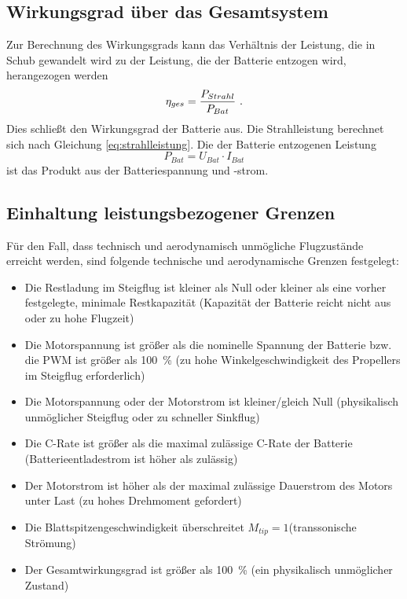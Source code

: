 \subsection{Wirkungsgrad über das Gesamtsystem}
\label{subsec:eta_ges}
Zur Berechnung des Wirkungsgrads kann das Verhältnis der Leistung, die in Schub gewandelt wird zu der Leistung, die der Batterie entzogen wird, herangezogen werden
\begin{equation}
	\eta_{ges} = \frac{P_{Strahl}}{P_{Bat}} ~\text{.}
\end{equation}
Dies schließt den Wirkungsgrad der Batterie aus.
Die Strahlleistung berechnet sich nach Gleichung \ref{eq:strahlleistung}.
Die der Batterie entzogenen Leistung
\begin{equation}
	P_{Bat} = U_{Bat}\cdot I_{Bat}
\end{equation}
ist das Produkt aus der Batteriespannung und -strom.


\subsection{Einhaltung leistungsbezogener Grenzen}
\label{subsec:grenzen}
Für den Fall, dass technisch und aerodynamisch unmögliche Flugzustände erreicht werden, sind folgende technische und aerodynamische Grenzen festgelegt:
\begin{itemize}
	\item Die Restladung im Steigflug ist kleiner als  Null oder kleiner als eine vorher festgelegte, minimale Restkapazität (Kapazität der Batterie reicht nicht aus oder zu hohe Flugzeit)
	\item Die Motorspannung ist größer als die nominelle Spannung der Batterie bzw. die PWM ist größer als \SI{100}{\%} (zu hohe Winkelgeschwindigkeit des Propellers im Steigflug erforderlich)
	\item Die Motorspannung oder der Motorstrom ist kleiner/gleich Null (physikalisch unmöglicher Steigflug oder zu schneller Sinkflug)
	\item Die C-Rate ist größer als die maximal zulässige C-Rate der Batterie (Batterieentladestrom ist höher als zulässig)
	\item Der Motorstrom ist höher als der maximal zulässige Dauerstrom des Motors unter Last (zu hohes Drehmoment gefordert)
	\item Die Blattspitzengeschwindigkeit überschreitet \ensuremath{M_{tip}=1}(transsonische Strömung)
	\item Der Gesamtwirkungsgrad ist größer als \SI{100}{\%} (ein physikalisch unmöglicher Zustand)
\end{itemize}

